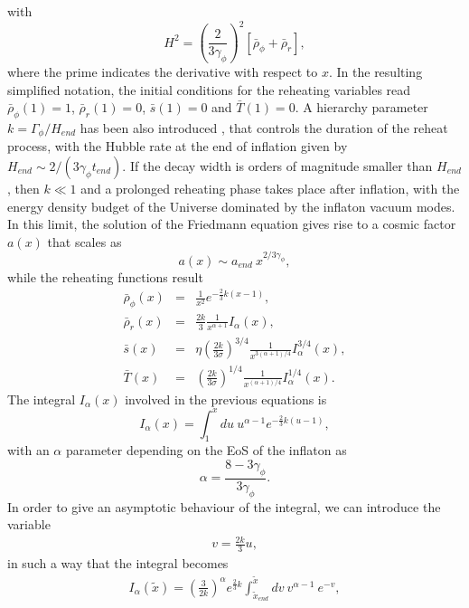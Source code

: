 \documentclass[%
aps,prd,nofootinbib,showkeys,a4paper,10pt
]{revtex4-2}
\begin{document}
with 
\begin{equation}
H^2=\left(\frac{2}{3\gamma_{\phi}}\right)^2\left[\bar{\rho}_{\phi}+\bar{\rho}_r\right] , 
\end{equation}
where the prime indicates the derivative with respect to $x$.
In the resulting simplified notation, the initial conditions for the reheating variables read 
$\bar{\rho}_{\phi}(1)=1$, $\bar{\rho}_r(1)=0$, $\bar{s}(1)=0$ and $\bar{T}(1)=0$. 
A hierarchy parameter $k=\Gamma_{\phi}/H_{end}$ has been also introduced \cite{29}, that controls the duration of the reheat process, 
with the Hubble rate at the end of inflation given by $H_{end}\sim 2/(3\gamma_{\phi} t_{end})$. 
If the decay width is orders of magnitude smaller than $H_{end}$, then $k\ll 1$ and a prolonged reheating phase takes place after inflation, 
with the energy density budget of the Universe dominated by the inflaton vacuum modes.
In this limit, the solution of the Friedmann equation gives rise to a cosmic factor $a(x)$ that scales as
\begin{equation}
a(x)\sim a_{end} \ x^{2/3\gamma_{\phi}} ,
\end{equation} 
while the reheating functions result
\begin{eqnarray}\label{eqn:generalsystem3}
\bar{\rho}_{\phi}(x)&=& \frac{1}{x^2}e^{-\frac{2}{3}k(x-1)},\\
\bar{\rho}_r(x)&=& \frac{2k}{3} \frac{1}{x^{\alpha+1}}I_{\alpha}(x),\\
\bar{s}(x)&=& \eta \left(\frac{2k}{3\sigma}\right)^{3/4} \frac{1}{x^{3(\alpha+1)/4}}I^{3/4}_{\alpha}(x),\\
\bar{T}(x)&=& \left(\frac{2k}{3\sigma}\right)^{1/4}\frac{1}{x^{(\alpha+1)/4}}I_{\alpha}^{1/4}(x).
\end{eqnarray}
The integral $I_{\alpha}(x)$ involved in the previous equations is 
\begin{equation}\label{eqn: Boltzmann integral}
I_{\alpha}(x)=\int_{1}^x du \ u^{\alpha-1}e^{-\frac{2}{3}k(u-1)} , 
\end{equation}
with an $\alpha$ parameter depending on the EoS of the inflaton as
\begin{equation}
\alpha=\frac{8-3\gamma_{\phi}}{3\gamma_{\phi}} .
\end{equation}
In order to give an asymptotic behaviour of the integral, we can introduce the variable 
\begin{eqnarray}
v=\frac{2k}{3}u ,
\end{eqnarray}
in such a way that the integral becomes
\begin{eqnarray}
I_{\alpha}(\tilde{x})=\left(\frac{3}{2k}\right)^{\alpha}e^{\frac{2}{3}k} \int_{\tilde{x}_{end}}^{\tilde{x}} dv \  v^{\alpha-1} \ e^{-v},
\end{eqnarray}
\end{document}
